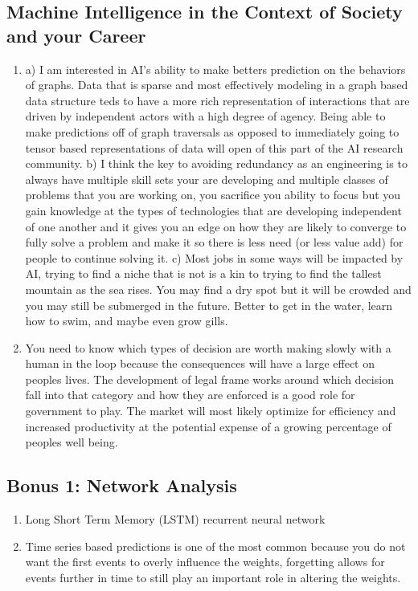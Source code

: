 \documentclass[main.tex]{subfiles}
\begin{document}
\subsection{Machine Intelligence in the Context of Society and your Career}
    \begin{enumerate}
        \item a) I am interested in AI's ability to make betters prediction on the behaviors of graphs. Data that is sparse and most effectively modeling in a graph based data structure teds to have a more rich representation of interactions that are driven by independent actors with a high degree of agency. Being able to make predictions off of graph traversals as opposed to immediately going to tensor based representations of data will open of this part of the AI research community. b) I think the key to avoiding redundancy as an engineering is to always have multiple skill sets your are developing and multiple classes of problems that you are working on, you sacrifice you ability to focus but you gain knowledge at the types of technologies that are developing independent of one another and it gives you an edge on how they are likely to converge to fully solve a problem and make it so there is less need (or less value add) for people to continue solving it. c) Most jobs in some ways will be impacted by AI, trying to find a niche that is not is a kin to trying to find the tallest mountain as the sea rises. You may find a dry spot but it will be crowded and you may still be submerged in the future. Better to get in the water, learn how to swim, and maybe even grow gills. 
        \item You need to know which types of decision are worth making slowly with a human in the loop because the consequences will have a large effect on peoples lives. The development of legal frame works around which decision fall into that category and how they are enforced is a good role for government to play. The market will most likely optimize for efficiency and increased productivity at the potential expense of a growing percentage of peoples well being.
    \end{enumerate}
    
\subsection{Bonus 1: Network Analysis}
    \begin{enumerate}
        \item Long Short Term Memory (LSTM) recurrent neural network
        \item Time series based predictions is one of the most common because you do not want the first events to overly influence the weights, forgetting allows for events further in time to still play an important role in altering the weights.
    \end{enumerate}
\end{document}
